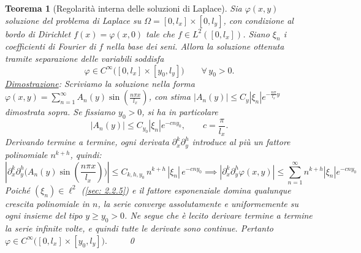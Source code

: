 \documentclass[a4paper,12pt]{report}
\newtheorem{teorema}{Teorema}[chapter]
\begin{document}
\begin{teorema}[Regolarità interna delle soluzioni di Laplace]
Sia $\varphi(x,y)$ soluzione del problema di Laplace su
$\Omega=[0,l_x]\times[0,l_y]$, con condizione al bordo di Dirichlet
$f(x)=\varphi(x,0)$ tale che $f\in L^2([0,l_x])$.
Siano $\xi_n$ i coefficienti di Fourier di $f$ nella base dei seni.
Allora la soluzione ottenuta tramite separazione delle variabili soddisfa
\[
\varphi \in C^\infty\big([0,l_x]\times[y_0,l_y]\big)
\qquad \forall\, y_0>0.
\]
\underline{Dimostrazione}: Scriviamo la soluzione nella forma $\varphi(x,y)=\sum_{n=1}^{\infty}
A_n(y)\sin\!\left(\frac{n\pi x}{l_x}\right)$, con stima $|A_n(y)| \le C_y |\xi_n| e^{-\frac{n\pi}{l_x}y}$ dimostrata sopra. Se fissiamo \(y_0>0\), si ha in particolare
\[
|A_n(y)| \le C_{y_0} |\xi_n| e^{-c n y_0},
\qquad c=\frac{\pi}{l_x}.
\]
Derivando termine a termine, ogni derivata \(\partial_x^k\partial_y^h\)
introduce al più un fattore polinomiale \(n^{k+h}\), quindi:
\[
\left|
\partial_x^k \partial_y^h
\Big(
A_n(y)\sin\!\left(\frac{n\pi x}{l_x}\right)
\Big)
\right|
\le
C_{k,h,y_0}\,
n^{k+h}\,
|\xi_n|\,
e^{-c n y_0}\implies
\left|\partial_x^k\partial_y^h \varphi(x,y)\right|
\le
\sum_{n=1}^{\infty}
n^{k+h}|\xi_n|e^{-c n y_0}
\]
Poiché \((\xi_n)\in \ell^2\) (\ref{sec: 2.2.5}) e il fattore esponenziale domina qualunque crescita polinomiale in \(n\), la serie converge assolutamente e uniformemente su ogni insieme del tipo \(y\ge y_0>0\). Ne segue che è lecito derivare termine a termine la serie infinite volte, e quindi tutte le derivate sono continue. Pertanto $\varphi \in C^\infty\big([0,l_x]\times[y_0,l_y]\big).
\qquad $ \qed

\end{teorema}

\newpage
\end{document}
